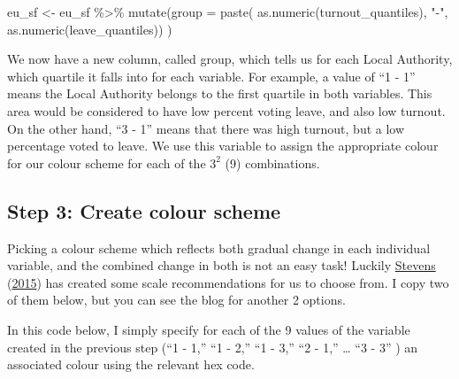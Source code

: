 \documentclass[
]{book}
\newenvironment{Shaded}{\begin{snugshade}}{\end{snugshade}}
\newcommand{\AttributeTok}[1]{\textcolor[rgb]{0.77,0.63,0.00}{#1}}
\newcommand{\FunctionTok}[1]{\textcolor[rgb]{0.00,0.00,0.00}{#1}}
\newcommand{\NormalTok}[1]{#1}
\newcommand{\OtherTok}[1]{\textcolor[rgb]{0.56,0.35,0.01}{#1}}
\newcommand{\SpecialCharTok}[1]{\textcolor[rgb]{0.00,0.00,0.00}{#1}}
\newcommand{\StringTok}[1]{\textcolor[rgb]{0.31,0.60,0.02}{#1}}
\begin{document}
\begin{Shaded}
\begin{Highlighting}[]
\NormalTok{eu\_sf }\OtherTok{\textless{}{-}}\NormalTok{ eu\_sf }\SpecialCharTok{\%\textgreater{}\%} 
  \FunctionTok{mutate}\NormalTok{(}\AttributeTok{group =} \FunctionTok{paste}\NormalTok{(}
      \FunctionTok{as.numeric}\NormalTok{(turnout\_quantiles), }\StringTok{"{-}"}\NormalTok{,}
      \FunctionTok{as.numeric}\NormalTok{(leave\_quantiles))}
\NormalTok{    )}
\end{Highlighting}
\end{Shaded}

We now have a new column, called group, which tells us for each Local Authority, which quartile it falls into for each variable. For example, a value of ``1 - 1'' means the Local Authority belongs to the first quartile in both variables. This area would be considered to have low percent voting leave, and also low turnout. On the other hand, ``3 - 1'' means that there was high turnout, but a low percentage voted to leave. We use this variable to assign the appropriate colour for our colour scheme for each of the \(3^2\) (9) combinations.

\hypertarget{step-3-create-colour-scheme}{%
\subsection{Step 3: Create colour scheme}\label{step-3-create-colour-scheme}}

Picking a colour scheme which reflects both gradual change in each individual variable, and the combined change in both is not an easy task! Luckily \protect\hyperlink{ref-Stevens_2015}{Stevens} (\protect\hyperlink{ref-Stevens_2015}{2015}) has created some scale recommendations for us to choose from. I copy two of them below, but you can see the blog for another 2 options.

In this code below, I simply specify for each of the 9 values of the variable created in the previous step (``1 - 1,'' ``1 - 2,'' ``1 - 3,'' ``2 - 1,'' \ldots{} ``3 - 3'' ) an associated colour using the relevant hex code.
\end{document}
